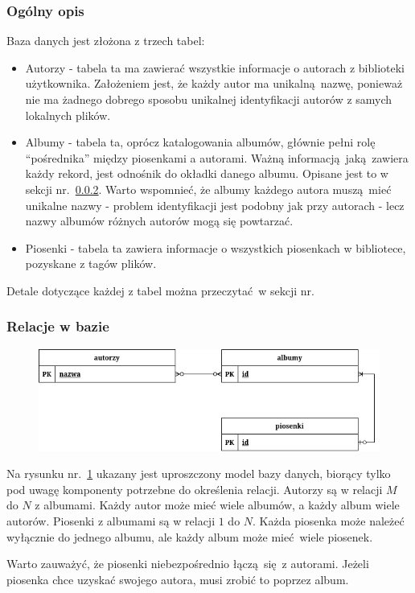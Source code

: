 \subsubsection{Ogólny opis}

Baza danych jest złożona z trzech tabel:

\begin{itemize}
	\item Autorzy - tabela ta ma zawierać wszystkie informacje o autorach z biblioteki użytkownika. Założeniem jest, że każdy autor ma unikalną nazwę, ponieważ nie ma żadnego dobrego sposobu unikalnej identyfikacji autorów z samych lokalnych plików.

	\item Albumy - tabela ta, oprócz katalogowania albumów, głównie pełni rolę \enquote{pośrednika} między piosenkami a autorami. Ważną informacją jaką zawiera każdy rekord, jest odnośnik do okładki danego albumu. Opisane jest to w sekcji nr.~\ref{sec:dbrelations}. Warto wspomnieć, że albumy każdego autora muszą mieć unikalne nazwy - problem identyfikacji jest podobny jak przy autorach - lecz nazwy albumów różnych autorów mogą się powtarzać. 
	
	\item Piosenki - tabela ta zawiera informacje o wszystkich piosenkach w bibliotece, pozyskane z tagów plików.
\end{itemize}

Detale dotyczące każdej z tabel można przeczytać w sekcji nr. \todo

\subsubsection{Relacje w bazie} \label{sec:dbrelations}

\begin{figure}[H]
	\centering
	\includegraphics[width=1\textwidth]{images/ch3-db-relacje.drawio.png}
	\caption{}
	\label{fig:dbrelations}
\end{figure}

Na rysunku nr.~\ref{fig:dbrelations} ukazany jest uproszczony model bazy danych, biorący tylko pod uwagę komponenty potrzebne do określenia relacji. Autorzy są w relacji $M$ do $N$ z albumami. Każdy autor może mieć wiele albumów, a każdy album wiele autorów. Piosenki z albumami są w relacji $1$ do $N$. Każda piosenka może należeć wyłącznie do jednego albumu, ale każdy album może mieć wiele piosenek.

Warto zauważyć, że piosenki niebezpośrednio łączą się z autorami. Jeżeli piosenka chce uzyskać swojego autora, musi zrobić to poprzez album.
